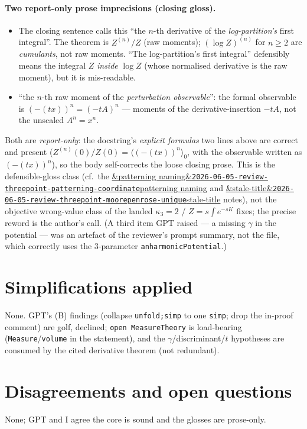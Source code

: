 \documentclass[11pt]{article}
\newcommand{\reviewref}[2][]{\href{https://therisensea.org/reviews/#2/}{\ifx&#1&\texttt{#2}\else#1\fi}}
\begin{document}
\paragraph{Two report-only prose imprecisions (closing gloss).}
\begin{itemize}[noitemsep]
  \item The closing sentence calls this ``the $n$-th derivative of the \emph{log-partition's} first integral''.
    The theorem is $Z^{(n)}/Z$ (raw moments); $(\log Z)^{(n)}$ for $n\ge2$ are \emph{cumulants}, not raw
    moments. ``The log-partition's first integral'' defensibly means the integral $Z$ \emph{inside} $\log Z$
    (whose normalised derivative is the raw moment), but it is mis-readable.
  \item ``the $n$-th raw moment of the \emph{perturbation observable}'': the formal observable is
    $(-(t x))^n=(-tA)^n$ --- moments of the derivative-insertion $-tA$, not the unscaled $A^n=x^n$.
\end{itemize}
Both are \emph{report-only}: the docstring's \emph{explicit formulas} two lines above are correct and present
($Z^{(n)}(0)/Z(0)=\langle(-(t x))^n\rangle_0$, with the observable written as $(-(t x))^n$), so the body
self-corrects the loose closing prose. This is the defensible-gloss class (cf.\ the
\reviewref[patterning naming]{2026-06-05-review-threepoint-patterning-coordinate} and
\reviewref[stale-title]{2026-06-05-review-threepoint-moorepenrose-unique} notes), not the objective
wrong-value class of the landed $\kappa_3=2$ / $Z=s\!\int e^{-sK}$ fixes; the precise reword is the author's
call. (A third item GPT raised --- a missing $\gamma$ in the potential --- was an artefact of the reviewer's
prompt summary, not the file, which correctly uses the 3-parameter \texttt{anharmonicPotential}.)

\section{Simplifications applied}
None. GPT's (B) findings (collapse \texttt{unfold;simp} to one \texttt{simp}; drop the in-proof comment) are
golf, declined; \texttt{open MeasureTheory} is load-bearing (\texttt{Measure}/\texttt{volume} in the
statement), and the $\gamma$/discriminant/$t$ hypotheses are consumed by the cited derivative theorem (not
redundant).

\section{Disagreements and open questions}
None; GPT and I agree the core is sound and the glosses are prose-only.
\end{document}
